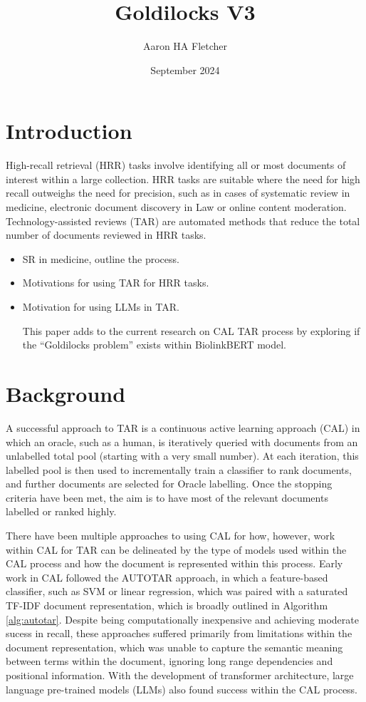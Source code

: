\documentclass{article}
\title{Goldilocks V3}
\author{Aaron HA Fletcher}
\date{September 2024}
\begin{document}
\maketitle

\section{Introduction}

High-recall retrieval (HRR) tasks involve identifying all or most documents of interest within a large collection. HRR tasks are suitable where the need for high recall outweighs the need for precision, such as in cases of systematic review in medicine, electronic document discovery in Law or online content moderation. Technology-assisted reviews (TAR) are automated methods that reduce the total number of documents reviewed in HRR tasks. 

\begin{itemize}
\item SR in medicine, outline the process.
\item Motivations for using TAR for HRR tasks.
\item Motivation for using LLMs in TAR.

This paper adds to the current research on CAL TAR process by exploring if the ``Goldilocks problem'' exists within BiolinkBERT model.
\end{itemize}
\section{Background}

A successful approach to TAR is a continuous active learning approach (CAL) in which an oracle, such as a human, is iteratively queried with documents from an unlabelled total pool (starting with a very small number). At each iteration, this labelled pool is then used to incrementally train a classifier to rank documents, and further documents are selected for Oracle labelling.  Once the stopping criteria have been met, the aim is to have most of the relevant documents labelled or ranked highly. 

There have been multiple approaches to using CAL for how, however, work within CAL for TAR can be delineated by the type of models used within the CAL process and how the document is represented within this process. Early work in CAL followed the AUTOTAR approach, in which a feature-based classifier, such as SVM or linear regression, which was paired with a saturated TF-IDF document representation, which is broadly outlined in Algorithm \ref{alg:autotar}. Despite being computationally inexpensive and achieving moderate sucess in recall, these approaches suffered primarily from limitations within the document representation, which was unable to capture the semantic meaning between terms within the document, ignoring long range dependencies and positional information.
With the development of transformer architecture, large language pre-trained models (LLMs) also found success within the CAL process. 
\end{document}
